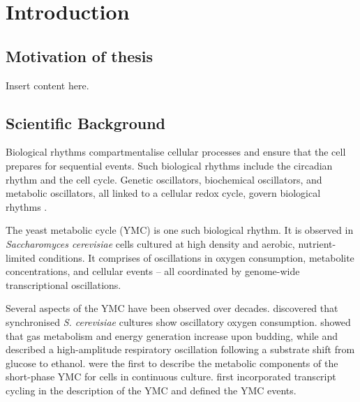 
\chapter{Introduction}

\section{Motivation of thesis}

Insert content here.

\section{Scientific Background}
\label{sec:intro-bg}


Biological rhythms compartmentalise cellular processes and ensure that the cell prepares for sequential events.
Such biological rhythms include the circadian rhythm and the cell cycle.
Genetic oscillators, biochemical oscillators, and metabolic oscillators, all linked to a cellular redox cycle, govern biological rhythms \citep{mellor_molecular_2016}.



The yeast metabolic cycle (YMC) is one such biological rhythm.
It is observed in \emph{Saccharomyces cerevisiae} cells cultured at high density and aerobic, nutrient-limited conditions.
It comprises of oscillations in oxygen consumption, metabolite concentrations, and cellular events -- all coordinated by genome-wide transcriptional oscillations.

Several aspects of the YMC have been observed over decades.
\citet{nosoh_synchronization_1962} discovered that synchronised \emph{S. cerevisiae} cultures show oscillatory oxygen consumption.
\citet{kaspar_von_meyenburg_energetics_1969} showed that gas metabolism and energy generation increase upon budding, while and \citet{mochan_respiratory_1973} described a high-amplitude respiratory oscillation following a substrate shift from glucose to ethanol.
\citet{satroutdinov_oscillatory_1992} were the first to describe the metabolic components of the short-phase YMC for cells in continuous culture.
\citet{tu_logic_2005} first incorporated transcript cycling in the description of the YMC and defined the YMC events.

